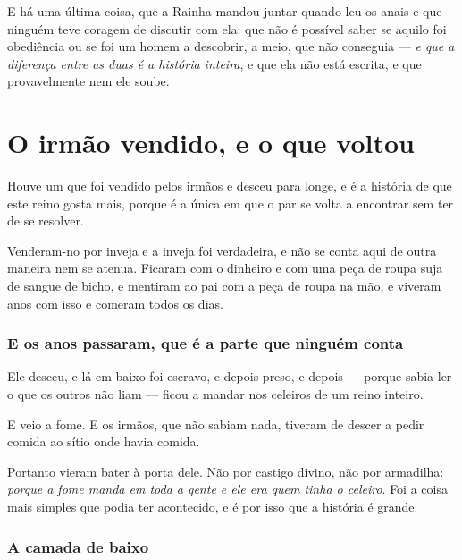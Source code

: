 \documentclass[livro.tex]{subfiles}
\begin{document}
\medskip

E há uma última coisa, que a Rainha mandou juntar quando leu os anais e que ninguém teve coragem
de discutir com ela: que não é possível saber se aquilo foi obediência ou se foi um homem a
descobrir, a meio, que não conseguia --- \emph{e que a diferença entre as duas é a história
inteira}, e que ela não está escrita, e que provavelmente nem ele soube.

\chapter{O irmão vendido, e o que voltou}

Houve um que foi vendido pelos irmãos e desceu para longe, e é a história de que este reino gosta
mais, porque é a única em que o par se volta a encontrar sem ter de se resolver.

\medskip

Venderam-no por inveja e a inveja foi verdadeira, e não se conta aqui de outra maneira nem se
atenua. Ficaram com o dinheiro e com uma peça de roupa suja de sangue de bicho, e mentiram ao pai
com a peça de roupa na mão, e viveram anos com isso e comeram todos os dias.

\subsection*{E os anos passaram, que é a parte que ninguém conta}

Ele desceu, e lá em baixo foi escravo, e depois preso, e depois --- porque sabia ler o que os
outros não liam --- ficou a mandar nos celeiros de um reino inteiro.

\medskip

E veio a fome. E os irmãos, que não sabiam nada, tiveram de descer a pedir comida ao sítio onde
havia comida.

\medskip

Portanto vieram bater à porta dele. Não por castigo divino, não por armadilha: \emph{porque a fome
manda em toda a gente e ele era quem tinha o celeiro}. Foi a coisa mais simples que podia ter
acontecido, e é por isso que a história é grande.

\subsection*{A camada de baixo}
\end{document}
